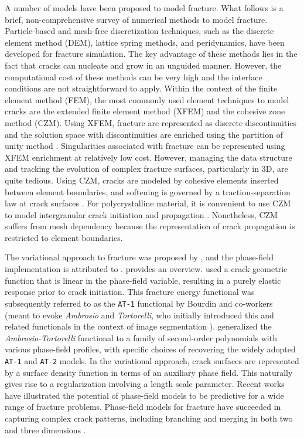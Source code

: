 A number of models have been proposed to model fracture. What follows is a brief, non-comprehensive survey of numerical methods to model fracture. Particle-based and mesh-free discretization techniques, such as the discrete element method (DEM), lattice spring methods, and peridynamics, have been developed for fracture simulation. The key advantage of these methods lies in the fact that cracks can nucleate and grow in an unguided manner. However, the computational cost of these methods can be very high and the interface conditions are not straightforward to apply. Within the context of the finite element method (FEM), the most commonly used element techniques to model cracks are the extended finite element method (XFEM) and the cohesive zone method (CZM). Using XFEM, fracture are represented as discrete discontinuities and the solution space with discontinuities are enriched using the partition of unity method \cite{babuaka1997, Dolbow99}. Singularities associated with fracture can be represented using XFEM enrichment at relatively low cost. However, managing the data structure and tracking the evolution of complex fracture surfaces, particularly in 3D, are quite tedious. Using CZM, cracks are modeled by cohesive elements inserted between element boundaries, and softening is governed by a traction-separation law at crack surfaces \cite{needleman_1992, ortiz_1999}. For polycrystalline material, it is convenient to use CZM to model intergranular crack initiation and propagation \cite{KAMAYA2007, KAMAYA2009}. Nonetheless, CZM suffers from mesh dependency because the representation of crack propagation is restricted to element boundaries.

The variational approach to fracture was proposed by \citet{Francfort98}, and the phase-field implementation is attributed to \citet{Bourdin2000}.
\citet{bourdin2008variational} provides an overview.
\citet{pham2013onset} used a crack geometric function that is linear in the phase-field variable, resulting in a purely elastic response prior to crack initiation.  This fracture energy functional was subsequently referred to as the \texttt{AT-1} functional by Bourdin and co-workers (meant to evoke \textit{Ambrosio} and \textit{Tortorelli}, who initially introduced this and related functionals in the context of image segmentation \cite{ambrosio1990approximation}). \citet{wu2017unified} generalized the \textit{Ambrosio-Tortorelli} functional \cite{ambrosio1990approximation} to a family of second-order polynomials with various phase-field profiles, with specific choices of recovering the widely adopted \texttt{AT-1} and \texttt{AT-2} models.
In the variational approach, crack surfaces are represented by a surface density function in terms of an auxiliary phase field. This naturally gives rise to a regularization involving a length scale parameter. Recent works have illustrated the potential of phase-field models to be predictive for a wide range of fracture problems. Phase-field models for fracture have succeeded in capturing complex crack patterns, including branching and merging in both two and three dimensions \cite{karma_2001, karma_2004, henry_2004, spatschek_2007, amor_2009}.

